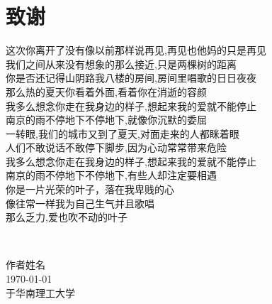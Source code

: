 \chapter{致\texorpdfstring{\quad}{}谢}
\begin{center}
这次你离开了没有像以前那样说再见,再见也他妈的只是再见 
~\\
我们之间从来没有想象的那么接近,只是两棵树的距离 
~\\
你是否还记得山阴路我八楼的房间,房间里唱歌的日日夜夜 
~\\
那么热的夏天你看着外面,看着你在消逝的容颜 
~\\
我多么想念你走在我身边的样子,想起来我的爱就不能停止 
~\\
南京的雨不停地下不停地下,就像你沉默的委屈 
~\\
一转眼,我们的城市又到了夏天,对面走来的人都眯着眼 
~\\
人们不敢说话不敢停下脚步,因为心动常常带来危险 
~\\
我多么想念你走在我身边的样子,想起来我的爱就不能停止 
~\\
南京的雨不停地下不停地下,有些人却注定要相遇 
~\\
你是一片光荣的叶子，落在我卑贱的心 
~\\
像往常一样我为自己生气并且歌唱 
~\\
那么乏力,爱也吹不动的叶子 
\end{center}

~\\

\begin{minipage}[t]{0.945\textwidth}%
	\begin{flushright}
		作者姓名\\
		\today\\	%
		于华南理工大学
		\par\end{flushright}
\end{minipage}

